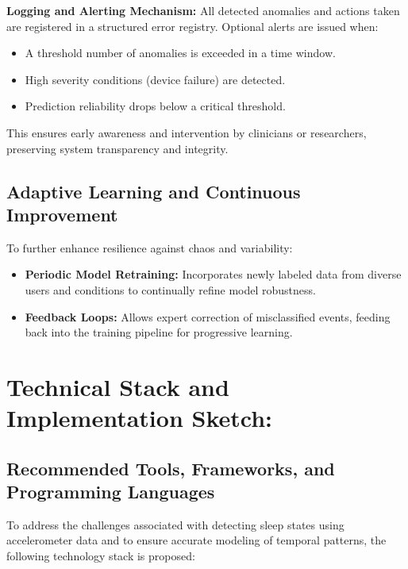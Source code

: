 \documentclass[conference]{IEEEtran}
\begin{document}
\item \textbf{Logging and Alerting Mechanism:}  
All detected anomalies and actions taken are registered in a structured error registry. Optional alerts are issued when:
\begin{itemize}
    \item A threshold number of anomalies is exceeded in a time window.
    \item High severity conditions (device failure) are detected.
    \item Prediction reliability drops below a critical threshold.
\end{itemize}
This ensures early awareness and intervention by clinicians or researchers, preserving system transparency and integrity.

\subsection{Adaptive Learning and Continuous Improvement}

To further enhance resilience against chaos and variability:
\begin{itemize}
\item \textbf{Periodic Model Retraining:} Incorporates newly labeled data from diverse users and conditions to continually refine model robustness.
\item \textbf{Feedback Loops:} Allows expert correction of misclassified events, feeding back into the training pipeline for progressive learning.
\end{itemize}

\section{Technical Stack and Implementation Sketch:}

\subsection{Recommended Tools, Frameworks, and Programming Languages}

To address the challenges associated with detecting sleep states using accelerometer data and to ensure accurate modeling of temporal patterns, the following technology stack is proposed:
\end{document}
